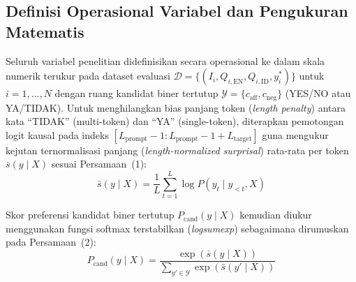 \documentclass[a4paper,10pt,twoside]{article}
\begin{document}
\subsection{Definisi Operasional Variabel dan Pengukuran Matematis}
Seluruh variabel penelitian didefinisikan secara operasional ke dalam skala numerik terukur pada dataset evaluasi $\mathcal{D} = \{(I_i, Q_{i,\mathrm{EN}}, Q_{i,\mathrm{ID}}, y_i^*)\}$ untuk $i = 1, \dots, N$ dengan ruang kandidat biner tertutup $\mathcal{Y} = \{c_{\mathrm{aff}}, c_{\mathrm{neg}}\}$ (YES/NO atau YA/TIDAK). Untuk menghilangkan bias panjang token (\textit{length penalty}) antara kata ``TIDAK'' (multi-token) dan ``YA'' (single-token), diterapkan pemotongan logit kausal pada indeks $[L_{\mathrm{prompt}} - 1 : L_{\mathrm{prompt}} - 1 + L_{\mathrm{target}}]$ guna mengukur kejutan ternormalisasi panjang (\textit{length-normalized surprisal}) rata-rata per token $\bar{s}(y \mid X)$ sesuai Persamaan~(1):
\begin{equation}
\bar{s}(y \mid X) = \frac{1}{L} \sum_{t=1}^L \log P(y_t \mid y_{<t}, X)
\end{equation}

Skor preferensi kandidat biner tertutup $P_{\mathrm{cand}}(y \mid X)$ kemudian diukur menggunakan fungsi softmax terstabilkan (\textit{logsumexp}) sebagaimana dirumuskan pada Persamaan~(2):
\begin{equation}
P_{\mathrm{cand}}(y \mid X) = \frac{\exp(\bar{s}(y \mid X))}{\sum_{y' \in \mathcal{Y}} \exp(\bar{s}(y' \mid X))}
\end{equation}
\end{document}
